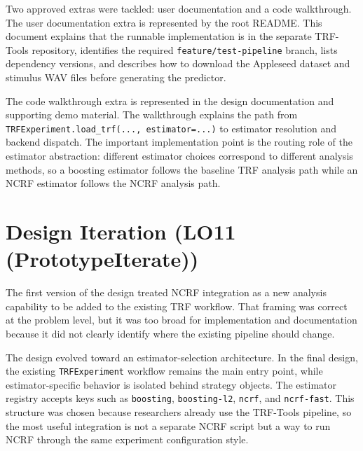 \documentclass{article}
\begin{document}

Two approved extras were tackled: user documentation and a code walkthrough. The user documentation extra is represented by the root README. This document explains that the runnable implementation is in the separate TRF-Tools repository, identifies the required \texttt{feature/test-pipeline} branch, lists dependency versions, and describes how to download the Appleseed dataset and stimulus WAV files before generating the predictor.

The code walkthrough extra is represented in the design documentation and supporting demo material. The walkthrough explains the path from \texttt{TRFExperiment.load\_trf(..., estimator=...)} to estimator resolution and backend dispatch. The important implementation point is the routing role of the estimator abstraction: different estimator choices correspond to different analysis methods, so a boosting estimator follows the baseline TRF analysis path while an NCRF estimator follows the NCRF analysis path.

\section{Design Iteration (LO11 (PrototypeIterate))}


The first version of the design treated NCRF integration as a new analysis capability to be added to the existing TRF workflow. That framing was correct at the problem level, but it was too broad for implementation and documentation because it did not clearly identify where the existing pipeline should change.

The design evolved toward an estimator-selection architecture. In the final design, the existing \texttt{TRFExperiment} workflow remains the main entry point, while estimator-specific behavior is isolated behind strategy objects. The estimator registry accepts keys such as \texttt{boosting}, \texttt{boosting-l2}, \texttt{ncrf}, and \texttt{ncrf-fast}. This structure was chosen because researchers already use the TRF-Tools pipeline, so the most useful integration is not a separate NCRF script but a way to run NCRF through the same experiment configuration style.
\end{document}
